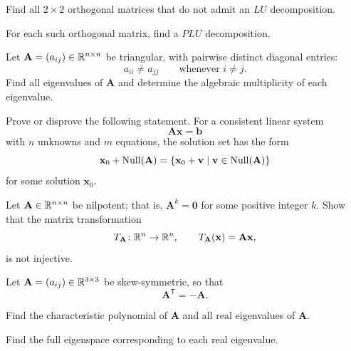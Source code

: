 \documentclass[11pt,oneside]{article}
\begin{document}
\begin{problem}
\begin{problemsubparts}
\item Find all $2\times2$ orthogonal matrices that do not admit an $LU$ decomposition.
\item For each such orthogonal matrix, find a $PLU$ decomposition.
\end{problemsubparts}
\end{problem}

\begin{problem}
Let $\mathbf A=(a_{ij})\in\mathbb{R}^{n\times n}$ be triangular, with pairwise distinct diagonal entries:
\[
a_{ii}\ne a_{jj}
\qquad\text{whenever }i\ne j.
\]
Find all eigenvalues of $\mathbf A$ and determine the algebraic multiplicity of each eigenvalue.
\end{problem}

\begin{problem}
Prove or disprove the following statement. For a consistent linear system
\[
\mathbf A\mathbf x=\mathbf b
\]
with $n$ unknowns and $m$ equations, the solution set has the form
\[
\mathbf x_0+\operatorname{Null}(\mathbf A)
=
\{\mathbf x_0+\mathbf v\mid \mathbf v\in\operatorname{Null}(\mathbf A)\}
\]
for some solution $\mathbf x_0$.
\end{problem}

\begin{problem}
Let $\mathbf A\in\mathbb{R}^{n\times n}$ be nilpotent; that is, $\mathbf A^k=\mathbf0$ for some positive integer $k$. Show that the matrix transformation
\[
T_{\mathbf A}\colon\mathbb{R}^n\to\mathbb{R}^n,
\qquad
T_{\mathbf A}(\mathbf x)=\mathbf A\mathbf x,
\]
is not injective.
\end{problem}

\begin{problem}
Let $\mathbf A=(a_{ij})\in\mathbb{R}^{3\times3}$ be skew-symmetric, so that
\[
\mathbf A^{\mathsf T}=-\mathbf A.
\]
\begin{problemsubparts}
\item Find the characteristic polynomial of $\mathbf A$ and all real eigenvalues of $\mathbf A$.
\item Find the full eigenspace corresponding to each real eigenvalue.
\end{problemsubparts}
\end{problem}
\end{document}
